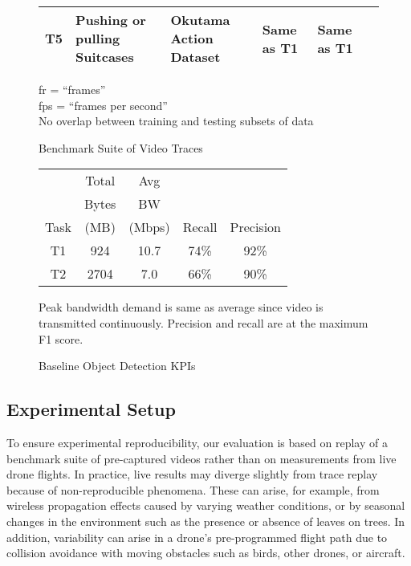 \begin{figure}
\begin{tabular}{|p{1cm}|p{2.5cm}|p{2.5cm}|p{2.5cm}|p{2.5cm}|p{2.5cm}|}
T5 &{\small Pushing or pulling Suitcases}&\small Okutama Action Dataset &\small Same as T1 &\small Same as T1 & \\
\hline
\end{tabular}
\vspace{0.1in}
\begin{captiontext}
fr = ``frames''\\
fps = ``frames per second''\\
No overlap between training and testing subsets of data
\end{captiontext}
\vspace{-0.1in}
\caption{Benchmark Suite of Video Traces}
\label{fig:benchmarksuite}
\end{figure}

\begin{figure}
\centering
\begin{tabular}{|c|c|c|c|c|}
\hline
     & Total & Avg & & \\ 
     & Bytes & BW & & \\ 
Task & (MB) & (Mbps) & Recall & Precision \\ 

\hline
T1 & \phantom{0}924 & 10.7 & 74\% & 92\%\\ 
\hline
T2 & 2704 & \phantom{0}7.0 & 66\% & 90\%\\ 
\hline
\end{tabular}
\vspace{0.2in}
\begin{captiontext}
Peak bandwidth demand is same as average since video is transmitted
continuously. Precision and recall are at the maximum F1 score.
\end{captiontext}
\caption{Baseline Object Detection KPIs}
\label{fig:baseline}
\end{figure}

\subsection{Experimental Setup}
\label{sec:dumbdrone-setup}

To ensure experimental reproducibility, our evaluation is based on
replay of a benchmark suite of pre-captured videos rather than on
measurements from live drone flights.  In practice, live results may
diverge slightly from trace replay because of non-reproducible
phenomena.  These can arise, for example, from wireless propagation
effects caused by varying weather conditions, or by seasonal changes
in the environment such as the presence or absence of leaves on trees.
In addition, variability can arise in a  drone's pre-programmed flight
path due to collision avoidance with moving obstacles such as birds,
other drones, or aircraft.

